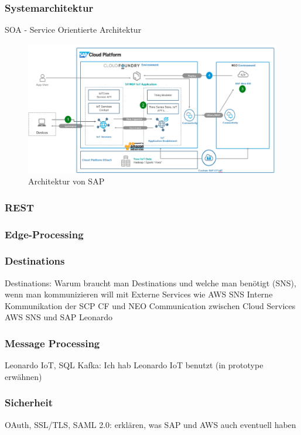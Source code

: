 \subsubsection{Systemarchitektur}

SOA - Service Orientierte Architektur
\begin{figure}[H]
    \centering
    \includegraphics[width=1.0\linewidth]{pictures/sap_architecture}
    \caption[Referenzarchitektur von SAP]{Architektur von SAP \citep{Ganz2019}}
    \label{fig:filename_without_extension}
\end{figure}


\subsubsection{REST}

\subsubsection{Edge-Processing}

\subsubsection{Destinations}
Destinations: Warum braucht man Destinations und welche man benötigt (SNS),  wenn man kommunizieren will mit
Externe Services wie AWS SNS
Interne Kommunikation der SCP CF und NEO
Communication zwischen Cloud Services AWS SNS und SAP Leonardo

\subsubsection{Message Processing}
Leonardo IoT, SQL Kafka: Ich hab Leonardo IoT benutzt (in prototype erwähnen)

\subsubsection{Sicherheit}
OAuth, SSL/TLS, SAML 2.0: erklären, was SAP und AWS auch eventuell haben

